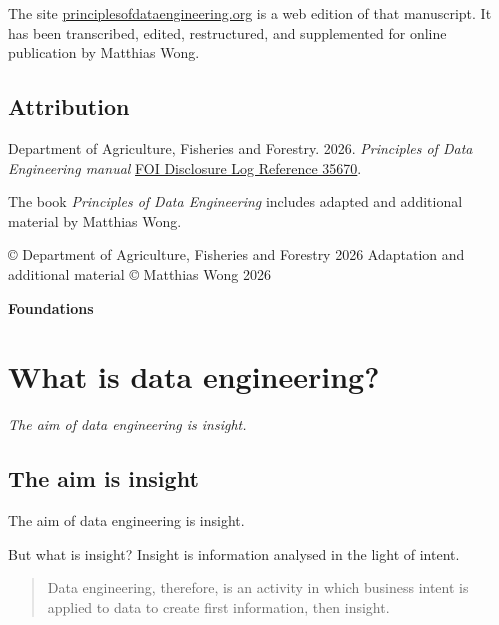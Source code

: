 \documentclass[10pt,openany,10pt]{book}
\begin{document}
The site
\href{https://principlesofdataengineering.org/?utm_source=pde_book}{principlesofdataengineering.org}
is a web edition of that manuscript. It has been transcribed, edited,
restructured, and supplemented for online publication by Matthias Wong.

\section{Attribution}\label{attribution}

Department of Agriculture, Fisheries and Forestry. 2026.
\emph{Principles of Data Engineering manual}
\href{https://www.agriculture.gov.au/sites/default/files/documents/35670.pdf}{FOI
Disclosure Log Reference 35670}.

The book \emph{Principles of Data Engineering} includes adapted and
additional material by Matthias Wong.

© Department of Agriculture, Fisheries and Forestry 2026 Adaptation and
additional material © Matthias Wong 2026

\newpage

\thispagestyle{empty}
\hypertarget{docs-foundations}{}
\vspace*{0.34\textheight}
\begin{center}
{\Huge\bfseries Foundations}
\end{center}
\newpage

\chapter{What is data
engineering?}\label{docs-foundations-what-is-data-engineering}

\emph{The aim of data engineering is insight.}

\section{The aim is insight}\label{the-aim-is-insight}

The aim of data engineering is insight.

But what is insight? Insight is information analysed in the light of
intent.

\begin{quote}
Data engineering, therefore, is an activity in which business intent is
applied to data to create first information, then insight.
\end{quote}
\end{document}
